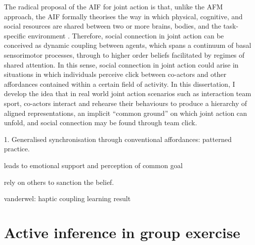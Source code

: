 \begin{CJK}{UTF8}{gbsn}

The radical proposal of the AIF for joint action is that, unlike the AFM approach, the AIF formally theorises the way in which physical, cognitive, and social resources are shared between two or more brains, bodies, and the task-specific environment \citep{Clark2015}.  Therefore, social connection in joint action can be conceived as dynamic coupling between agents, which spans a continuum of basal sensorimotor processes, through to higher order beliefs facilitated by regimes of shared attention.  In this sense, social connection in joint action could arise in situations in which individuals perceive click between co-actors and other affordances contained within a certain field of activity.  In this dissertation, I develop the idea that in real world joint action scenarios such as interaction team sport, co-actors interact and rehearse their behaviours to produce a hierarchy of aligned representations, an implicit ``common ground'' \citep[cf.][]{Noy2017} on which joint action can unfold, and social connection may be found through team click.


1. Generalised synchronisation through conventional affordances:
patterned practice.

leads to emotional support and perception of common goal

rely on others to sanction the belief.

vanderwel: haptic coupling learning result





































\section{Active inference in group exercise \label{sect:activeInfGE}}


\end{CJK}
